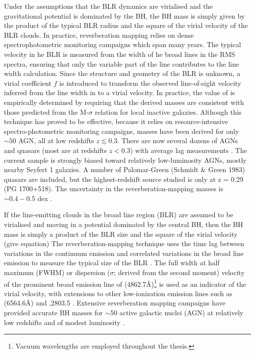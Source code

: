 Under the assumptions that the BLR dynamics are virialised and the gravitational potential is dominated by the BH, the BH mass is simply given by the product of the typical BLR radius and the square of the virial velocity of the BLR clouds. 
In practice, reverberation mapping relies on dense spectrophotometric monitoring campaigns which span many years. 
The typical velocity in he BLR is measured from the width of he broad \hb lines in the RMS spectra, ensuring that only the variable part of the line contributes to the line width calculation. 
Since the structure and geometry of the BLR is unknown, a virial coefficient $f$ is introduced to transform the observed line-of-sight velocity inferred from the line width in to a virial velocity. 
In practice, the value of is empirically determined by requiring that the derived masses are consistent with those predicted from the M-$\sigma$ relation for local inactive galaxies. 
Although this technique has proved to be effective, because it relies on resource-intensive spectro-photometric monitoring campaigns, masses have been derived for only $\sim50$ AGN, all at low redshifts $z\lesssim0.3$. 
There are now several dozens of AGNs and quasars (most are at redshifts $z<0.3$) with average lag measurements \citep[e.g.][]{kaspi00,peterson04,bentz09,denney10,barth11,grier12}. 
The current sample is strongly biased toward relatively low-luminosity AGNs, mostly nearby Seyfert 1 galaxies.
A number of Palomar-Green (Schmidt \& Green 1983) quasars are included, but the highest-redshift
source studied is only at z = 0.29 (PG 1700+518).
The uncertainty in the reverberation-mapping masses is $\sim0.4-0.5$ dex \citep[e.g.][]{peterson10}.

If the line-emitting clouds in the broad line region (BLR) are assumed to be virialised and moving in a potential dominated by the central BH, then the BH mass is simply a product of the BLR size and the square of the virial velocity (give equation)
The reverberation-mapping technique uses the time lag between variations in the continuum emission and correlated variations in the broad line emission to measure the typical size of the BLR \citep{peterson93,peterson14}. 
The full width at half maximum (FWHM) or dispersion ($\sigma$; derived from the second moment) velocity of the prominent broad emission line of \hb (4862.7\AA)\footnote{Vacuum wavelengths are employed throughout the thesis.} 
is used as an indicator of the virial velocity, with extensions to other low-ionization emission lines such as \ha (6564.6\AA) and ,2803.5 \citep[e.g.][]{vestergaard02,mclure02,wu04,kollmeier06,onken08,wang09,rafiee11}.
Extensive reverberation mapping campaigns have provided accurate BH masses for $\sim$50 active galactic nuclei (AGN) at relatively low redshifts and of modest luminosity \citep[e.g.][]{kaspi00,kaspi07,peterson04,bentz09,denney10}. 

